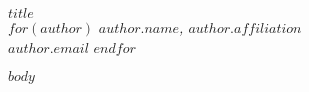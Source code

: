 \documentclass[12pt,a4paper]{article}
\begin{document}
\raggedbottom
\begin{center}
\textbf{$title$}\\
\vspace{0.5em}
$for(author)$
\textit{$author.name$, $author.affiliation$}\\
\vspace{0.25em}
$author.email$
$endfor$
\end{center}

$body$

\renewcommand\bibname{References} %
\end{document}

